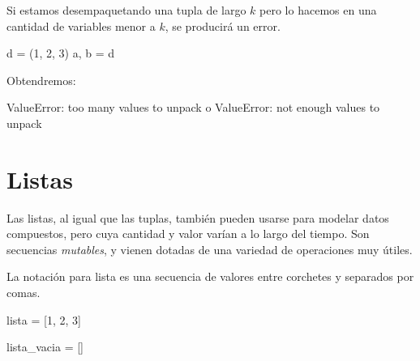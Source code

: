 \documentclass[
  letterpaper,
  DIV=11,
  numbers=noendperiod]{scrreprt}
\newenvironment{Shaded}{\begin{snugshade}}{\end{snugshade}}
\newcommand{\DecValTok}[1]{\textcolor[rgb]{0.68,0.00,0.00}{#1}}
\newcommand{\NormalTok}[1]{\textcolor[rgb]{0.00,0.23,0.31}{#1}}
\newcommand{\OperatorTok}[1]{\textcolor[rgb]{0.37,0.37,0.37}{#1}}
\begin{document}
\begin{tcolorbox}[enhanced jigsaw, bottomrule=.15mm, leftrule=.75mm, opacityback=0, colback=white, toprule=.15mm, bottomtitle=1mm, opacitybacktitle=0.6, rightrule=.15mm, left=2mm, arc=.35mm, coltitle=black, title=\textcolor{quarto-callout-warning-color}{\faExclamationTriangle}\hspace{0.5em}{¡Cuidado!}, breakable, toptitle=1mm, colframe=quarto-callout-warning-color-frame, titlerule=0mm, colbacktitle=quarto-callout-warning-color!10!white]

Si estamos desempaquetando una tupla de largo \(k\) pero lo hacemos en
una cantidad de variables menor a \(k\), se producirá un error.

\begin{Shaded}
\begin{Highlighting}[]
\NormalTok{d }\OperatorTok{=}\NormalTok{ (}\DecValTok{1}\NormalTok{, }\DecValTok{2}\NormalTok{, }\DecValTok{3}\NormalTok{)}
\NormalTok{a, b }\OperatorTok{=}\NormalTok{ d}
\end{Highlighting}
\end{Shaded}

Obtendremos:

\begin{Shaded}
\begin{Highlighting}[]
\NormalTok{ValueError: too many values to unpack}
\NormalTok{o}
\NormalTok{ValueError: not enough values to unpack}
\end{Highlighting}
\end{Shaded}

\end{tcolorbox}

\section{Listas}\label{listas}

Las listas, al igual que las tuplas, también pueden usarse para modelar
datos compuestos, pero cuya cantidad y valor varían a lo largo del
tiempo. Son secuencias \emph{mutables}, y vienen dotadas de una variedad
de operaciones muy útiles.

La notación para lista es una secuencia de valores entre corchetes y
separados por comas.

\begin{Shaded}
\begin{Highlighting}[]
\NormalTok{lista }\OperatorTok{=}\NormalTok{ [}\DecValTok{1}\NormalTok{, }\DecValTok{2}\NormalTok{, }\DecValTok{3}\NormalTok{]}

\NormalTok{lista\_vacia }\OperatorTok{=}\NormalTok{ []}
\end{Highlighting}
\end{Shaded}
\end{document}
